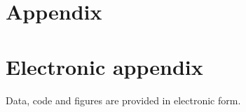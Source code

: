 \documentclass[12pt]{article}
\begin{document}


\setcounter{page}{5}

\appendix

\section{Appendix}
\label{app}
% 
\newpage

\section{Electronic appendix}
\label{el_app}

Data, code and figures are provided in electronic form.

\newpage
    

\RaggedRight



% 

\end{document}
